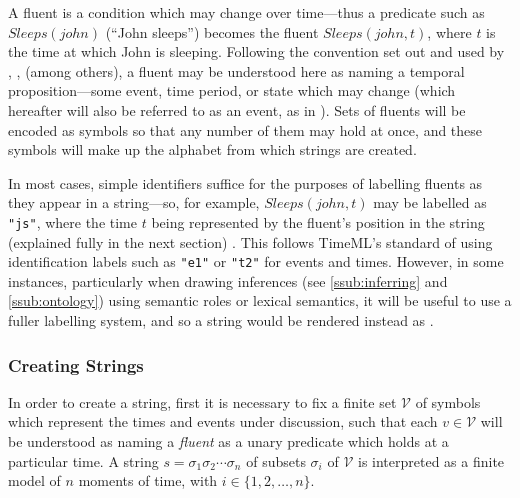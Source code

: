 \documentclass[a4paper,12pt,leqno]{article}
\newcommand{\vph}[1]{\vphantom{#1}}
\newcommand{\ebox}[1]{\fbox{$\vph{'(),}#1$}}
\newcommand{\EventString}[1]{%
	\renewcommand*{\do}[1]{\ebox{##1}}%
	\PipeParser{#1}%
}
\newcommand{\citeneeded}[1][]{{\color{red}[Citation needed!#1]}}
\newcommand{\selfnote}[1]{{\color{red}[NB\footnote{{\color{red}#1}}]}}
\newcommand{\nb}{\selfnote}
\begin{document}

A fluent is a condition which may change over time---thus a predicate such as $\allowbreak{}Sleeps(john)$ (``John sleeps'') becomes the fluent $Sleeps(john, t)$, where $t$ is the time at which John is sleeping. Following the convention set out and used by \citet{Mccarthy69somephilosophical}, \citet{van2008proper}, \citet{fernando2016prior} (among others), a fluent may be understood here as naming a temporal proposition---some event, time period, or state which may change (which hereafter will also be referred to as an event, as in \citet{Pustejovsky2005}). Sets of fluents will be encoded as symbols so that any number of them may hold at once, and these symbols will make up the alphabet from which strings are created.

In most cases, simple identifiers suffice for the purposes of labelling fluents as they appear in a string---so, for example, $Sleeps(john, t)$ may be labelled as \texttt{"js"}, where the time $t$ being represented by the fluent's position in the string (explained fully in the next section)%
. This follows TimeML's standard \citep{pustejovsky2010iso} of using identification labels such as \texttt{"e1"} or \texttt{"t2"} for events and times. However, in some instances, particularly when drawing inferences (see \cref{ssub:inferring} and \cref{ssub:ontology}) using semantic roles or lexical semantics, it will be useful to use a fuller labelling system, and so a string \EventString{{}|js|{}} would be rendered instead as \EventString{{}|sleeps(john)|{}}.

\subsubsection{Creating Strings}\label{ssub:creating}
In order to create a string, first it is necessary to fix a finite set $\mathcal{V}$ of symbols which represent the times and events under discussion, such that each $v \in \mathcal{V}$ will be understood as naming a \textit{fluent} as a unary predicate which holds at a particular time. A string $s = \sigma_1\sigma_2\cdots\sigma_n$ of subsets $\sigma_i$ of $\mathcal{V}$ is interpreted as a finite model of $n$ moments of time, with $i \in \{1, 2, \ldots, n\}$.
\end{document}
